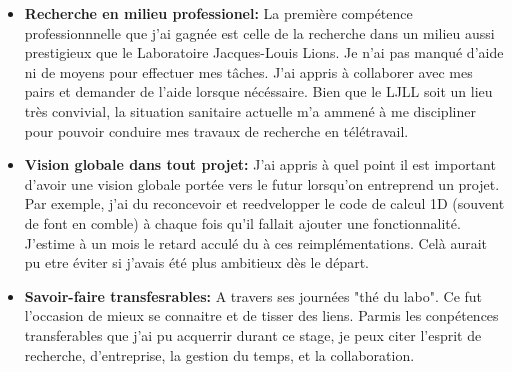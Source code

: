\begin{itemize}
    \item \textbf{Recherche en milieu professionel:} La première compétence professionnnelle que j'ai gagnée est celle de la recherche dans un milieu aussi prestigieux que le Laboratoire Jacques-Louis Lions. Je n'ai pas manqué d'aide ni de moyens pour effectuer mes tâches. J'ai appris à collaborer avec mes pairs et demander de l'aide lorsque nécéssaire. Bien que le LJLL soit un lieu très convivial, la situation sanitaire actuelle m'a ammené à me discipliner pour pouvoir conduire mes travaux de recherche en télétravail.
    \item \textbf{Vision globale dans tout projet:} J'ai appris à quel point il est important d'avoir une vision globale portée vers le futur lorsqu'on entreprend un projet. Par exemple, j'ai du reconcevoir et reedvelopper le code de calcul 1D (souvent de font en comble) à chaque fois qu'il fallait ajouter une fonctionnalité. J'estime à un mois le retard acculé du à ces reimplémentations. Celà aurait pu etre éviter si j'avais été plus ambitieux dès le départ.
    \item \textbf{Savoir-faire transfesrables:} A travers ses journées "thé du labo". Ce fut l'occasion de mieux se connaitre et de tisser des liens. Parmis les conpétences transferables que j'ai pu acquerrir durant ce stage, je peux citer l'esprit de recherche, d'entreprise, la gestion du temps, et la collaboration.
\end{itemize}